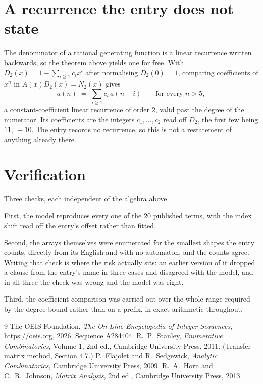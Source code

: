 \documentclass[11pt,a4paper]{article}
\theoremstyle{plain}
\theoremstyle{definition}
\begin{document}
\section{A recurrence the entry does not state}

The denominator of a rational generating function is a linear recurrence written backwards, so
the theorem above yields one for free. With $D_2(x)=1-\sum_{i\ge1}c_ix^i$ after normalising
$D_2(0)=1$, comparing coefficients of $x^n$ in $A(x)D_2(x)=N_2(x)$ gives
\[
a(n)\;=\;\sum_{i\ge1}c_i\,a(n-i)\qquad\text{for every }n>5,
\]
a constant-coefficient linear recurrence of order $2$, valid past the degree of the
numerator. Its coefficients are the integers $c_1,\dots,c_{2}$ read off $D_2$, the first few being $11,\ -10$. The entry records no recurrence, so this is not a restatement of anything
already there.

\section{Verification}

Three checks, each independent of the algebra above.

First, the model reproduces every one of the $20$ published terms, with the index shift
read off the entry's offset rather than fitted.

Second, the arrays themselves were enumerated for the smallest shapes the entry counts,
directly from its English and with no automaton, and the counts agree. Writing that check is
where the risk actually sits: an earlier version of it dropped a clause from the entry's name
in three cases and disagreed with the model, and in all three the check was wrong and the model
was right.

Third, the coefficient comparison was carried out over the whole range required by the degree
bound rather than on a prefix, in exact arithmetic throughout.

\begin{thebibliography}{9}
 The OEIS Foundation, \emph{The On-Line Encyclopedia of Integer
Sequences}, \url{https://oeis.org}, 2026. Sequence A284404.
 R.~P.~Stanley, \emph{Enumerative Combinatorics}, Volume 1, 2nd ed.,
Cambridge University Press, 2011. (Transfer-matrix method, Section 4.7.)
 P.~Flajolet and R.~Sedgewick, \emph{Analytic Combinatorics}, Cambridge
University Press, 2009.
 R.~A.~Horn and C.~R.~Johnson, \emph{Matrix Analysis}, 2nd ed., Cambridge
University Press, 2013.
\end{thebibliography}
\end{document}
